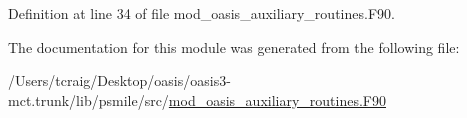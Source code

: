 Definition at line 34 of file mod\+\_\+oasis\+\_\+auxiliary\+\_\+routines.\+F90.



The documentation for this module was generated from the following file\+:\begin{DoxyCompactItemize}
\item 
/\+Users/tcraig/\+Desktop/oasis/oasis3-\/mct.\+trunk/lib/psmile/src/\hyperlink{mod__oasis__auxiliary__routines_8_f90}{mod\+\_\+oasis\+\_\+auxiliary\+\_\+routines.\+F90}\end{DoxyCompactItemize}
